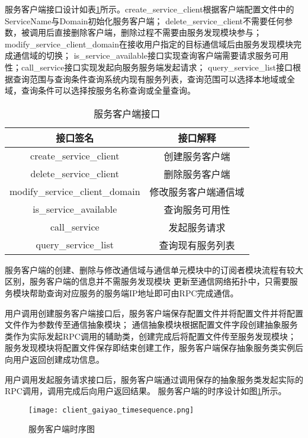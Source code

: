 服务客户端接口设计如表\ref{service_client_interface}所示。create\_service\_client根据客户端配置文件中的ServiceName与Domain初始化服务客户端；
delete\_service\_client不需要任何参数，被调用后直接删除客户端，删除过程不需要由服务发现模块参与；
modify\_service\_client\_domain在接收用户指定的目标通信域后由服务发现模块完成通信域的切换；
is\_service\_available接口实现查询客户端需要请求服务可用性；call\_service接口实现发起向服务服务端发起请求；
query\_service\_list接口根据查询范围与查询条件查询系统内现有服务列表，查询范围可以选择本地域或全域，查询条件可以选择按服务名称查询或全量查询。
\begin{table}[htb]
  \centering\small
  \caption{服务客户端接口}
  \label{service_client_interface}
  \begin{tabular}{cc}
    \toprule
    接口签名 & 接口解释 \\
    \midrule
    create\_service\_client & 创建服务客户端\\
    delete\_service\_client & 删除服务客户端\\
    modify\_service\_client\_domain & 修改服务客户端通信域\\
    is\_service\_available & 查询服务可用性 \\
    call\_service & 发起服务请求\\
    query\_service\_list & 查询现有服务列表\\
    \bottomrule
  \end{tabular}
\end{table}

服务客户端的创建、删除与修改通信域与通信单元模块中的订阅者模块流程有较大区别，服务客户端的信息并不需服务发现模块
更新至通信网络拓扑中，只需要服务模块帮助查询对应服务的服务端IP地址即可由RPC完成通信。

用户调用创建服务客户端接口后，服务客户端保存配置文件并将配置文件并将配置文件作为参数传至通信抽象模块；
通信抽象模块根据配置文件字段创建抽象服务类作为实际发起RPC调用的辅助类，创建完成后将配置文件传至服务发现模块；
服务发现模块将配置文件保存即结束创建工作，服务客户端保存抽象服务类实例后向用户返回创建成功信息。

用户调用发起服务请求接口后，服务客户端通过调用保存的抽象服务类发起实际的RPC调用，调用完成后向用户返回结果。
服务客户端的时序设计如图\ref{client_gaiyao_timesequence}所示。

\begin{figure}[H]
  \centering
  \texttt{[image: client\_gaiyao\_timesequence.png]}
  \caption{服务客户端时序图}
  \label{client_gaiyao_timesequence}
\end{figure}

